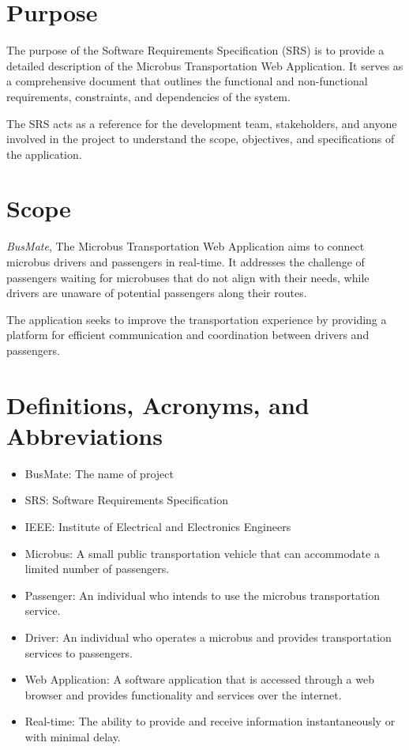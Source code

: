 \documentclass{BusMateSRS}
\def\projectName{BusMate}
\begin{document}
\section{Purpose}
The purpose of the Software Requirements Specification (SRS) is to provide 
a detailed description of the Microbus Transportation Web Application. 
It serves as a comprehensive document that outlines the functional and 
non-functional requirements, constraints, and dependencies of the system. 

The SRS acts as a reference for the development team, stakeholders, and anyone 
involved in the project to understand the scope, objectives, and specifications 
of the application.


\section{Scope}
\emph{\projectName}, The Microbus Transportation Web Application aims to 
connect microbus drivers and passengers in real-time. 
It addresses the challenge of passengers waiting for microbuses that 
do not align with their needs, while drivers are unaware of potential passengers 
along their routes. 

The application seeks to improve the transportation experience by providing 
a platform for efficient communication and coordination between drivers and 
passengers. 


\section{Definitions, Acronyms, and Abbreviations}
\begin{itemize}
  \item {\projectName}: 
    The name of project
  \item SRS: 
    Software Requirements Specification
  \item IEEE: 
    Institute of Electrical and Electronics Engineers
  \item Microbus: 
    A small public transportation vehicle that can accommodate 
    a limited number of passengers.
  \item Passenger:
    An individual who intends to use the microbus transportation service.
  \item Driver:
    An individual who operates a microbus and provides transportation 
    services to passengers.
  \item Web Application:
    A software application that is accessed through a web browser and provides 
    functionality and services over the internet.
  \item Real-time: The ability to provide and receive information 
    instantaneously or with minimal delay.
\end{itemize}
\end{document}
